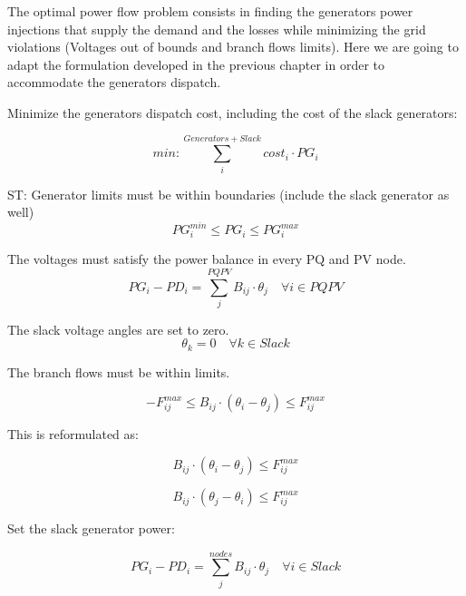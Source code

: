 \documentclass[a4paper,twoside,fleqn]{tufte-book}
\begin{document}
The optimal power flow problem consists in finding the generators power injections that supply the demand and the losses while minimizing the grid violations (Voltages out of bounds and branch flows limits). Here we are going to adapt the formulation developed in the previous chapter in order to accommodate the generators dispatch.

Minimize the generators dispatch cost, including the cost of the slack generators:

\begin{equation}
min: \sum_i^{Generators+Slack} cost_i \cdot PG_i 
\end{equation}

ST: 
Generator limits must be within boundaries (include the slack generator as well)
\begin{equation}
PG_i^{min} \leq PG_i \leq PG_i^{max}
\end{equation}



The voltages must satisfy the power balance in every PQ and PV node.
\begin{equation}
PG_i - PD_i=\sum_j^{PQPV} B_{ij} \cdot \theta_j  \quad  \forall i \in PQPV
\end{equation}

The slack voltage angles are set to zero.
\begin{equation}
\theta_k=0   \quad \forall k \in Slack
\end{equation}


The branch flows must be within limits.

\begin{equation}
-F_{ij}^{max} \leq B_{ij}⋅(\theta_i - \theta_j) \leq F_{ij}^{max}
\end{equation}


This is reformulated as:

\begin{equation}
 B_{ij}⋅(\theta_i - \theta_j) \leq F_{ij}^{max}
\end{equation}

\begin{equation}
 B_{ij}⋅(\theta_j - \theta_i) \leq F_{ij}^{max}
\end{equation}

Set the slack generator power:

\begin{equation}
PG_i - PD_i=\sum_j^{nodes} B_{ij} \cdot \theta_j  \quad  \forall i \in Slack
\end{equation}
\end{document}
